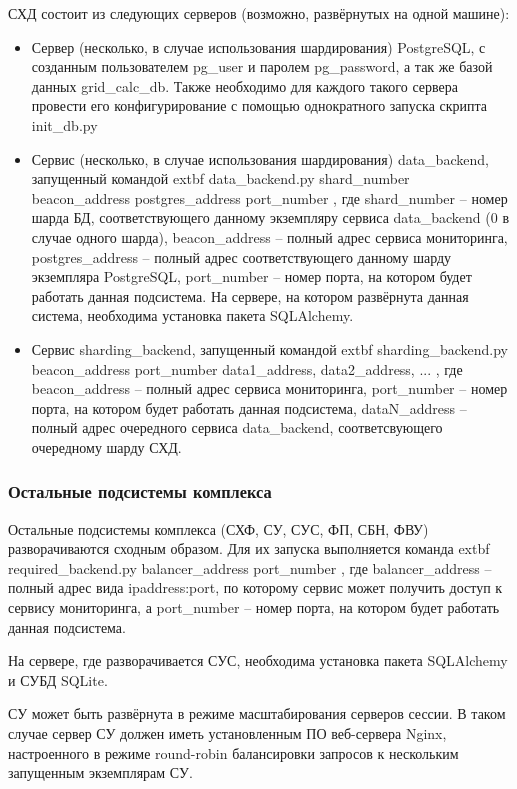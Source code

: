 \documentclass[a4paper,12pt]{report}
\numberwithin{equation}{section}
\begin{document}
  СХД состоит из следующих серверов (возможно, развёрнутых на одной машине):
  \begin{itemize}
    \item Сервер (несколько, в случае использования шардирования) PostgreSQL, с созданным пользователем pg\_user и паролем pg\_password, а так же базой данных grid\_calc\_db. Также необходимо для каждого такого сервера провести его конфигурирование с помощью однократного запуска скрипта init\_db.py
    \item Сервис (несколько, в случае использования шардирования) data\_backend, запущенный командой 
    extbf{ data\_backend.py shard\_number beacon\_address postgres\_address port\_number },
    где shard\_number -- номер шарда БД, соответствующего данному экземпляру сервиса data\_backend (0 в случае одного шарда),
    beacon\_address -- полный адрес сервиса мониторинга,
    postgres\_address -- полный адрес соответствующего данному шарду экземпляра PostgreSQL, 
    port\_number -- номер порта, на котором будет работать данная подсистема.
    На сервере, на котором развёрнута данная система, необходима установка пакета SQLAlchemy.
    \item Сервис sharding\_backend, запущенный командой 
    extbf{ sharding\_backend.py beacon\_address port\_number data1\_address, data2\_address, ... },
    где beacon\_address -- полный адрес сервиса мониторинга,
    port\_number -- номер порта, на котором будет работать данная подсистема,
    dataN\_address -- полный адрес очередного сервиса data\_backend, соответсвующего очередному шарду СХД.
  \end{itemize}
  
  \subsubsection{Остальные подсистемы комплекса}
  Остальные подсистемы комплекса (СХФ, СУ, СУС, ФП, СБН, ФВУ) разворачиваются сходным образом.
  Для их запуска выполняется команда 
  extbf{ required\_backend.py balancer\_address port\_number }
  , где balancer\_address -- полный адрес вида ipaddress:port, по которому сервис может получить доступ к сервису мониторинга,
  а port\_number -- номер порта, на котором будет работать данная подсистема.
  
  На сервере, где разворачивается СУС, необходима установка пакета SQLAlchemy и СУБД SQLite.
  
  СУ может быть развёрнута в режиме масштабирования серверов сессии. 
  В таком случае сервер СУ должен иметь установленным ПО веб-сервера Nginx, настроенного в режиме round-robin балансировки запросов к нескольким запущенным экземплярам СУ.
  
\end{document}
